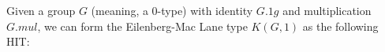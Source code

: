 \documentclass[14pt]{extarticle}
\begin{document}
Given a group $G$ (meaning, a 0-type) with identity $G.1g$ and multiplication $G.mul$, we can form the Eilenberg-Mac Lane type $K(G, 1)$ as the following HIT:
\begin{code}%
	\>[0]\AgdaSpace{}%
	\AgdaSpace{}%
	\AgdaSymbol{(}\AgdaSpace{}%
	\AgdaSymbol{:}\AgdaSpace{}%
	\AgdaSymbol{)}\AgdaSpace{}%
	\AgdaSymbol{:}\AgdaSpace{}%
	\AgdaSpace{}%
	\<%
	\\
	\>[0][@{}l@{\AgdaIndent{0}}]%
	\>[2]\AgdaSpace{}%
	\AgdaSymbol{:}\AgdaSpace{}%
	\<%
	\\
	\>[2]\AgdaSpace{}%
	\AgdaSymbol{:}\AgdaSpace{}%
	\AgdaSpace{}%
	\AgdaSymbol{$\to$}\AgdaSpace{}%
	\AgdaSymbol{(}\AgdaSpace{}%
	\AgdaOperator{\AgdaFunction{$\equiv$}}\AgdaSpace{}%
	\AgdaSymbol{)}\<%
	\\
	\>[2]\AgdaSpace{}%
	\AgdaSymbol{:}\AgdaSpace{}%
	\AgdaSpace{}%
	\AgdaSpace{}%
	\AgdaOperator{\AgdaFunction{$\equiv$}}\AgdaSpace{}%
	\AgdaSpace{}%
	\<%
	\\
	\>[2]\AgdaSpace{}%
	\AgdaSymbol{:}\AgdaSpace{}%
	\AgdaSymbol{(}\AgdaSpace{}%
	\AgdaSpace{}%
	\AgdaSymbol{:}\AgdaSpace{}%
	\AgdaSymbol{)}\AgdaSpace{}%
	\AgdaSymbol{$\to$}\AgdaSpace{}%
	\AgdaSpace{}%
	\AgdaSymbol{(}\AgdaSpace{}%
	\AgdaSpace{}%
	\AgdaSymbol{)}\AgdaSpace{}%
	\AgdaOperator{\AgdaFunction{$\equiv$}}\AgdaSpace{}%
	\AgdaSymbol{(}\AgdaSpace{}%
	\AgdaSymbol{)}\AgdaSpace{}%
	\AgdaSpace{}%
	\AgdaSymbol{(}\AgdaSpace{}%
	\AgdaSymbol{)}\<%
	\\
	\>[2]\AgdaSpace{}%

\end{code}
\end{document}
